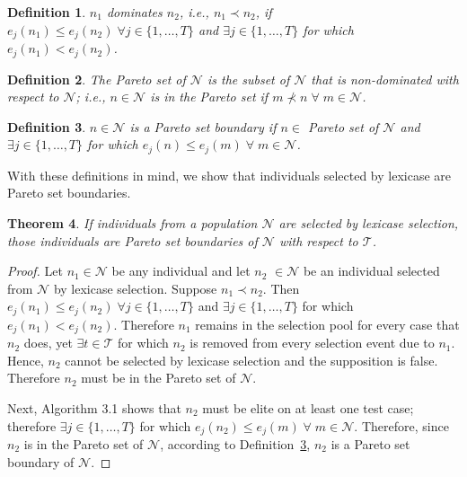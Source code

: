 \documentclass[twoside]{article}
\newtheorem{lex}{Theorem}[section]
\newtheorem{defn}[lex]{Definition}
\begin{document}
\begin{defn}\label{def:dom}
$n_1$ {\it dominates} $n_2$, i.e., ${n_1} \prec {n_2}$, if $e_j(n_1) \leq e_j(n_2) \;
\forall j  \in \{1,\dots,T\}$ and $\exists j \in \{1,\dots,T\}$ for which $e_j(n_1) < e_j(n_2)$. \bigskip
\end{defn}

\begin{defn}\label{def:pset}
The {\it Pareto set} of $\mathcal{N}$ is the subset of $\mathcal{N}$ that is non-dominated with respect to $\mathcal{N}$; i.e., $n \in \mathcal{N}$ is in the Pareto set if $m \nprec n \; \forall \; m \in \mathcal{N}$. 
\end{defn}

\begin{defn}\label{def:boundary}
$n \in \mathcal{N}$ is a {\it Pareto set boundary} if $n \in$ Pareto set of $\mathcal{N}$ and $\exists j \in \{1,\dots,T\}$ for which $e_j(n) \leq e_j(m) \; \forall \; m \in \mathcal{N}$. 
\end{defn}

With these definitions in mind, we show that individuals selected by lexicase are Pareto set boundaries. 

\begin{lex}\label{thm:lex}
If individuals from a population $\mathcal{N}$ are selected by lexicase selection, those individuals are Pareto set boundaries of $\mathcal{N}$ with respect to $\mathcal{T}$. 
\end{lex}

\begin{proof}
Let $n_1 \in \mathcal{N}$ be any individual and let $n_2$ $\in \mathcal{N}$ be an individual selected from $\mathcal{N}$ by lexicase selection. Suppose $n_1 \prec n_2$. Then $e_j(n_1) \leq e_j(n_2) \;
\forall j  \in \{1,\dots,T\}$ and $\exists j \in \{1,\dots,T\}$ for which $e_j(n_1) < e_j(n_2)$. Therefore $n_1$ remains in the selection pool for every case that $n_2$ does, yet $\exists t \in \mathcal{T}$ for which $n_2$ is removed from every selection event due to $n_1$. Hence, $n_2$ cannot be selected by lexicase selection and the supposition is false. Therefore $n_2$ must be in the Pareto set of $\mathcal{N}$. 

Next, Algorithm 3.1 shows that $n_2$ must be elite on at least one test case; therefore $\exists j \in \{1,\dots,T\}$ for which $e_j(n_2) \leq e_j(m) \; \forall \; m \in \mathcal{N}$. Therefore, since $n_2$ is in the Pareto set of $\mathcal{N}$, according to Definition~\ref{def:boundary}, $n_2$ is a Pareto set boundary of $\mathcal{N}$.  
\end{proof}
\bigskip
\end{document}
